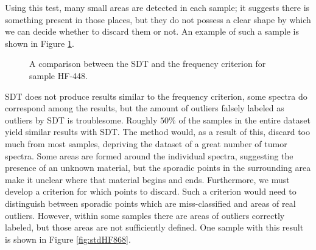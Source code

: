 Using this test, many small areas are detected in each sample; it suggests there is something present in those places, but they do not possess a clear shape by which we can decide whether to discard them or not. An example of such a sample is shown in Figure \ref{fig:stdHF448}.

\begin{figure}[H]

    \centering
    \qquad
    \caption{A comparison between the SDT and the frequency criterion for sample HF-448.
\label{fig:stdHF448}}%
\end{figure}

SDT does not produce results similar to the frequency criterion, some spectra do correspond among the results, but the amount of outliers falsely labeled as outliers by SDT is troublesome. Roughly $50\%$ of the samples in the entire dataset yield similar results with SDT. The method would, as a result of this, discard too much from most samples, depriving the dataset of a great number of tumor spectra. Some areas are formed around the individual spectra, suggesting the presence of an unknown material, but the sporadic points in the surrounding area make it unclear where that material begins and ends. Furthermore, we must develop a criterion for which points to discard. Such a criterion would need to distinguish between sporadic points which are miss-classified and areas of real outliers. However, within some samples there are areas of outliers correctly labeled, but those areas are not sufficiently defined. One sample with this result is shown in Figure \ref{fig:stdHF868}.

